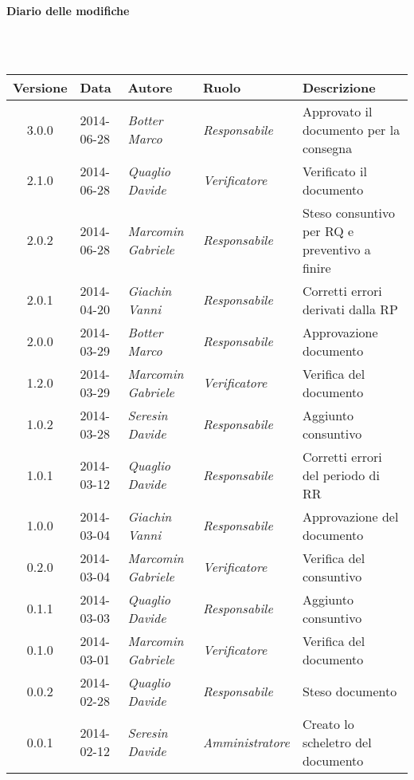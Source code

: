 \noindent\begin{Large}\textbf{Diario delle modifiche}\end{Large}\\
\\
\begin{small}
\begin{tabular}{|c|p{1.8cm}|p{2.8cm}|p{2.8cm}|p{3.5cm}|}
\hline
Versione & Data & Autore & Ruolo & Descrizione \\
\hline
\hline
3.0.0 & 2014-06-28 & 
\textit{Botter Marco} &
\textit{Responsabile} &  Approvato il documento per la consegna\\
\hline
2.1.0 & 2014-06-28 & 
\textit{Quaglio Davide} &
\textit{Verificatore} &  Verificato il documento\\
\hline
2.0.2 & 2014-06-28 & 
\textit{Marcomin Gabriele} &
\textit{Responsabile} &  Steso consuntivo per RQ e preventivo a finire\\
\hline
2.0.1 & 2014-04-20 & 
\textit{Giachin Vanni} &
\textit{Responsabile} &  Corretti errori derivati dalla RP\\
\hline
2.0.0 & 2014-03-29 & 
\textit{Botter Marco} &
\textit{Responsabile} &  Approvazione documento\\
\hline
1.2.0 & 2014-03-29 & 
\textit{Marcomin Gabriele} &
\textit{Verificatore} &  Verifica del documento\\
\hline
1.0.2 & 2014-03-28 & 
\textit{Seresin Davide} &
\textit{Responsabile} &  Aggiunto consuntivo\\
\hline
1.0.1 & 2014-03-12 & 
\textit{Quaglio Davide} &
\textit{Responsabile} &  Corretti errori del periodo di RR\\
\hline
1.0.0 & 2014-03-04 & 
\textit{Giachin Vanni} &
\textit{Responsabile} &  Approvazione del documento\\
\hline
0.2.0 & 2014-03-04 & 
\textit{Marcomin Gabriele} &
\textit{Verificatore} &  Verifica del consuntivo\\
\hline
0.1.1 & 2014-03-03 & 
\textit{Quaglio Davide} &
\textit{Responsabile} &  Aggiunto consuntivo\\
\hline
0.1.0 & 2014-03-01 & 
\textit{Marcomin Gabriele} &
\textit{Verificatore} &  Verifica del documento \\
\hline
0.0.2 & 2014-02-28 & 
\textit{Quaglio Davide} &
\textit{Responsabile} &  Steso documento\\
\hline
0.0.1 & 2014-02-12 & 
\textit{Seresin Davide} &
\textit{Amministratore} &  Creato lo scheletro del documento\\
\hline
\end{tabular}\\
\end{small}